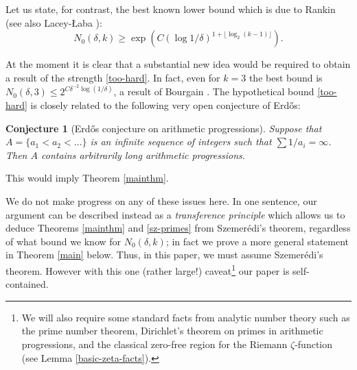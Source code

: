 \documentclass[12pt,a4paper,reqno]{amsart}
\numberwithin{equation}{section}
\theoremstyle{plain}
\newtheorem{conjecture}[subsection]{Conjecture}
\theoremstyle{definition}
\renewcommand{\leq}{\leqslant}
\renewcommand{\geq}{\geqslant}
\def\vs{\vspace{11pt}}
\def\ni{\noindent}
\begin{document}
\ni Let us state, for contrast, the best known lower bound which is due to Rankin \cite{rankin} (see also Lacey-{\L}aba \cite{laba-lacey}):
\[ N_0(\delta,k) \geq \exp(C(\log 1/\delta)^{1 + \lfloor \log_2 (k-1)\rfloor}).\]

\ni At the moment it is clear that a substantial new idea would be required to obtain a result of the strength \eqref{too-hard}. In fact, even for $k = 3$ the best bound is $N_0(\delta,3) \leq 2^{C\delta^{-2}\log(1/\delta)}$, a result of Bourgain \cite{bourgain-triples}. The hypothetical bound \eqref{too-hard} is closely related to the following very open conjecture of Erd\H{o}s:
\begin{conjecture}[Erd\H{o}s conjecture on arithmetic progressions] Suppose that $A = \{a_1 < a_2 < \dots\}$ is an infinite sequence of integers such that $\sum 1/a_i = \infty$. Then $A$ contains arbitrarily long arithmetic progressions.
\end{conjecture}
\ni This would imply Theorem \ref{mainthm}.\vs

\ni We do not make progress on any of these issues here. In one sentence, our argument can be described instead as a \textit{transference principle} which allows us to deduce Theorems \ref{mainthm} and \ref{sz-primes} from Szemer\'edi's theorem, regardless of what bound we know for $N_0(\delta,k)$; in fact we prove a more general statement in Theorem \ref{main} below. Thus, in this paper, we must assume Szemer\'edi's theorem. However with this one (rather large!) caveat\footnote{We will also require some standard facts from analytic number theory such as the prime number theorem, Dirichlet's theorem on primes in arithmetic progressions, and the classical zero-free region for the Riemann $\zeta$-function (see Lemma \ref{basic-zeta-facts}).} our paper is self-contained.\vs
\end{document}
